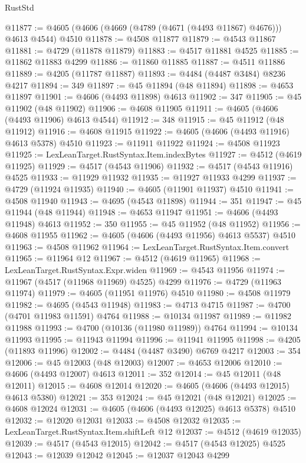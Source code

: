 \begin{lexlean}{RustStd}
\begin{coremodule}
@11877 := @4605 (@4606 (@4669 (@4789 (@4671 (@4493 @11867) @4676))) @4613 @4544) @4510
@11878 := @4508 @11877
@11879 := @4543 @11867
@11881 := @4729 (@11878 @11879)
@11883 := @4517 @11881 @4525
@11885 := @11862 @11883 @4299
@11886 := @11860 @11885
@11887 := @4511 @11886
@11889 := @4205 (@11787 @11887)
@11893 := @4484 (@4487 @3484) @8236 @4217
@11894 := 349
@11897 := @45 @11894 (@48 @11894)
@11898 := @4653 @11897
@11901 := @4606 (@4493 @11898) @4613
@11902 := 347
@11905 := @45 @11902 (@48 @11902)
@11906 := @4608 @11905
@11911 := @4605 (@4606 (@4493 @11906) @4613 @4544)
@11912 := 348
@11915 := @45 @11912 (@48 @11912)
@11916 := @4608 @11915
@11922 := @4605 (@4606 (@4493 @11916) @4613 @5378) @4510
@11923 := @11911 @11922
@11924 := @4508 @11923
@11925 := LexLeanTarget.RustSyntax.Item.indexBytes
@11927 := @4512 (@4619 @11925)
@11929 := @4517 (@4543 @11906)
@11932 := @4517 (@4543 @11916) @4525
@11933 := @11929 @11932
@11935 := @11927 @11933 @4299
@11937 := @4729 (@11924 @11935)
@11940 := @4605 (@11901 @11937) @4510
@11941 := @4508 @11940
@11943 := @4695 (@4543 @11898)
@11944 := 351
@11947 := @45 @11944 (@48 @11944)
@11948 := @4653 @11947
@11951 := @4606 (@4493 @11948) @4613
@11952 := 350
@11955 := @45 @11952 (@48 @11952)
@11956 := @4608 @11955
@11962 := @4605 (@4606 (@4493 @11956) @4613 @5537) @4510
@11963 := @4508 @11962
@11964 := LexLeanTarget.RustSyntax.Item.convert
@11965 := @11964 @12
@11967 := @4512 (@4619 @11965)
@11968 := LexLeanTarget.RustSyntax.Expr.widen
@11969 := @4543 @11956
@11974 := @11967 (@4517 (@11968 @11969) @4525) @4299
@11976 := @4729 (@11963 @11974)
@11979 := @4605 (@11951 @11976) @4510
@11980 := @4508 @11979
@11982 := @4695 (@4543 @11948)
@11983 := @4713 @4715
@11987 := @4700 (@4701 @11983 @11591) @4764
@11988 := @10134 @11987
@11989 := @11982 @11988
@11993 := @4700 (@10136 (@11980 @11989)) @4764
@11994 := @10134 @11993
@11995 := @11943 @11994
@11996 := @11941 @11995
@11998 := @4205 (@11893 @11996)
@12002 := @4484 (@4487 @3490) @6769 @4217
@12003 := 354
@12006 := @45 @12003 (@48 @12003)
@12007 := @4653 @12006
@12010 := @4606 (@4493 @12007) @4613
@12011 := 352
@12014 := @45 @12011 (@48 @12011)
@12015 := @4608 @12014
@12020 := @4605 (@4606 (@4493 @12015) @4613 @5380)
@12021 := 353
@12024 := @45 @12021 (@48 @12021)
@12025 := @4608 @12024
@12031 := @4605 (@4606 (@4493 @12025) @4613 @5378) @4510
@12032 := @12020 @12031
@12033 := @4508 @12032
@12035 := LexLeanTarget.RustSyntax.Item.shiftLeft @12
@12037 := @4512 (@4619 @12035)
@12039 := @4517 (@4543 @12015)
@12042 := @4517 (@4543 @12025) @4525
@12043 := @12039 @12042
@12045 := @12037 @12043 @4299

\end{coremodule}
\end{lexlean}
